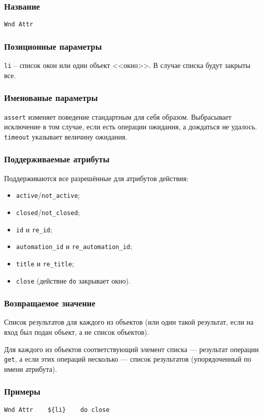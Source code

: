 \documentclass[11pt]{book} %
\begin{document}
\subsubsection*{Название} 
\verb"Wnd Attr"

\subsubsection*{Позиционные параметры} 
\verb"li" -- список окон или один объект <<окно>>. В случае списка будут закрыты все.

\subsubsection*{Именованые параметры} 
\verb"assert" изменяет поведение стандартным для себя образом. Выбрасывает исключение в том случае, если есть операции ожидания, а дождаться не удалось.
\verb"timeout" указывает величину ожидания.

\subsubsection*{Поддерживаемые атрибуты} 

Поддерживаются все разрешённые для атрибутов действия:

\begin{itemize}
	\item \verb"active"/\verb"not_active";
	\item \verb"closed"/\verb"not_closed";
	\item \verb"id" и \verb"re_id";
	\item \verb"automation_id" и \verb"re_automation_id";
	\item \verb"title" и \verb"re_title";
	\item \verb"close" (действие \verb"do" закрывает окно).
\end{itemize}

\subsubsection*{Возвращаемое значение} 
Список результатов для каждого из объектов (или один такой результат, если на вход был подан объект, а не список объектов).

Для каждого из объектов соответствующий элемент списка --- результат операции \verb|get|, а если этих операций несколько --- список результатов (упорядоченный по имени атрибута).

\subsubsection*{Примеры}
\begin{verbatim}Wnd Attr    ${li}    do close\end{verbatim}
\end{document}
